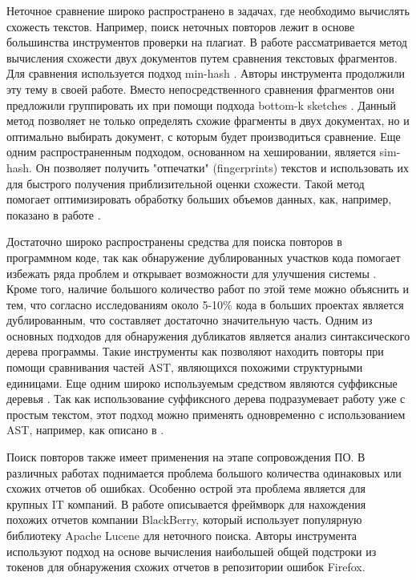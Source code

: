 \documentclass[14pt]{matmex-diploma-custom}
\begin{document}
Неточное сравнение широко распространено в задачах, где необходимо вычислять схожесть текстов. Например, поиск неточных повторов лежит в основе большинства инструментов проверки на плагиат. В работе \cite{bib:tool:Allign} рассматривается метод вычисления схожести двух документов путем сравнения текстовых фрагментов. Для сравнения используется подход min-hash \cite{bib:art:MinHash}. Авторы инструмента \cite{bib:tool:TxtAling} продолжили эту тему в своей работе. Вместо непосредственного сравнения фрагментов они предложили группировать их при помощи подхода bottom-k sketches \cite{bib:art:Bottom-sketch}. Данный метод позволяет не только определять схожие фрагменты в двух документах, но и оптимально выбирать документ, с которым будет производиться сравнение. Еще одним распространенным подходом, основанном на хешировании, является sim-hash\cite{bib:art:SimHash}. Он позволяет получить "отпечатки" (fingerprints) текстов и использовать их для быстрого получения приблизительной оценки схожести. Такой метод помогает оптимизировать обработку больших объемов данных, как, например, показано в работе \cite{bib:tool:SpamDetect}.

Достаточно широко распространены средства для поиска повторов в программном коде, так как обнаружение дублированных участков кода помогает избежать ряда проблем и открывает возможности для улучшения системы \cite{bib:art:SoftwareClonesSurvey, bib:art:SoftwareClonesReview}. Кроме того, наличие большого количество работ по этой теме можно объяснить и тем, что согласно исследованиям \cite{bib:art:LagueCloneStudy, bib:art:BakerCloneStudy} около 5-10\% кода в больших проектах является дублированным, что составляет достаточно значительную часть. Одним из основных подходов для обнаружения дубликатов является анализ синтаксического дерева программы. Такие инструменты как \cite{bib:tool:ASTRefactor, bib:tool:ASTSearch} позволяют находить повторы при помощи сравнивания частей AST, являющихся похожими структурными единицами. Еще одним широко используемым средством являются суффиксные деревья \cite{bib:art:SuffixTree}. Так как использование суффиксного дерева подразумевает работу уже с простым текстом, этот подход можно применять одновременно с использованием AST, например, как описано в \cite{bib:tool:ASTSuffix}.

Поиск повторов также имеет применения на этапе сопровождения ПО. В различных работах поднимается проблема большого количества одинаковых или схожих отчетов об ошибках. Особенно острой эта проблема является для крупных IT компаний. В работе \cite{bib:tool:DefectDetection} описывается фреймворк для нахождения похожих отчетов компании BlackBerry, который использует популярную библиотеку Apache Lucene \cite{bib:tool:Lucene} для неточного поиска. Авторы инструмента \cite{bib:tool:DuplicateBugs} используют подход на основе вычисления наибольшей общей подстроки из токенов \cite{bib:art:LCS} для обнаружения схожих отчетов в репозитории ошибок Firefox.
\end{document}
